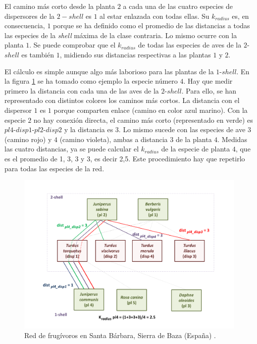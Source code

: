 El camino más corto desde la planta $2$ a cada una de las cuatro especies de dispersores de la $2-shell$ es $1$ al estar enlazada con todas ellas. Su $k_{radius}$ es, en consecuencia, $1$ porque se ha definido como el promedio de las distancias a todas las especies de la \textit{shell} máxima de la clase contraria. Lo mismo ocurre con la planta $1$. Se puede comprobar que el $k_{radius}$ de todas las especies de aves de la $2$-$shell$ es también $1$, midiendo sus distancias respectivas a las plantas $1$ y $2$.

El cálculo es simple aunque algo más laborioso para las plantas de la $1$-$shell$. En la figura \ref{fig:ESTATICA_SD_030_example_distances} se ha tomado como ejemplo la especie número $4$. Hay que medir primero la distancia con cada una de las aves de la $2$-$shell$. Para ello, se han representado con distintos colores los caminos más cortos. La distancia con el dispersor $1$ es $1$ porque comparten enlace (camino en color azul marino). Con la especie $2$ no hay conexión directa, el camino más corto (representado en verde) es $pl4$-$disp1$-$pl2$-$disp2$ y la distancia es $3$. Lo mismo sucede con las especies de ave $3$ (camino rojo) y $4$ (camino violeta), ambas a distancia $3$ de la planta $4$. Medidas las cuatro distancias, ya se puede calcular el $k_{radius}$ de la especie de planta $4$, que es el promedio de 1, 3, 3 y 3, es decir 2,5. Este procedimiento hay que repetirlo para todas las especies de la red.

\begin{figure}[h!]
\centering
\includegraphics[scale=0.52]{Figures/ESTATICA_SD_030_example_distances.pdf}
\caption {Red de frugívoros en Santa Bárbara, Sierra de Baza (España) \cite{jordano1993geographical}.}
\label{fig:ESTATICA_SD_030_example_distances}
\end{figure}

